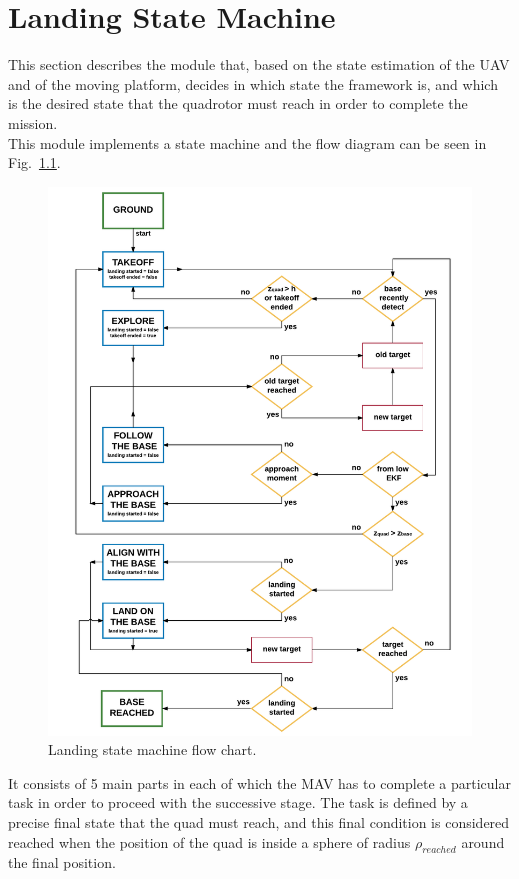 \chapter{Landing State Machine}\label{chap:area_exploration}
This section describes the module that, based on the state estimation of the UAV and of the moving platform, decides in which state the framework is, and which is the desired state that the quadrotor must reach in order to complete the mission.\\
This module implements a state machine and the flow diagram can be seen in Fig.~\ref{fig:area_exploration_state_machine}.

\begin{figure}[!htbp]
    \centering
    \includegraphics[width=1\textwidth]{img/state_machine.pdf}
    \caption{Landing state machine flow chart.}
    \label{fig:area_exploration_state_machine}
\end{figure}

It consists of 5 main parts in each of which the MAV has to complete a particular task in order to proceed with the successive stage. The task is defined by a precise final state that the quad must reach, and this final condition is considered reached when the position of the quad is inside a sphere of radius $\rho_{reached}$ around the final position.\\

